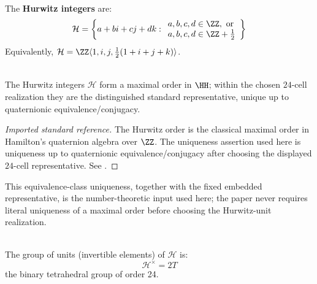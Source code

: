 \documentclass[11pt]{article}
\begin{document}
\begin{definition}
\label{p1:def:hurwitz-integers}
\mbox{}\\[6pt] 
The \textbf{Hurwitz integers} are:
\begin{equation}
    \mathcal{H} = \left\{a + bi + cj + dk : 
    \begin{array}{l}
    a,b,c,d \in \ZZ, \text{ or} \\
    a,b,c,d \in \ZZ + \tfrac{1}{2}
    \end{array}
    \right\}
\end{equation}
Equivalently, $\mathcal{H} = \ZZ\langle 1, i, j, \frac{1}{2}(1+i+j+k)\rangle$.
\end{definition}

\begin{theorem}[Hurwitz, 1896]
\label{p1:thm:hurwitz-maximal-order}
\mbox{}\\[6pt] 
The Hurwitz integers $\mathcal{H}$ form a maximal order in $\HH$; within the chosen \(24\)-cell realization they are the distinguished standard representative, unique up to quaternionic equivalence/conjugacy.
\cite{voight2021quaternion,conwaysmith2003quaternions}
\end{theorem}

\begin{proof}[Imported standard reference]
\leavevmode\par\noindent
The Hurwitz order is the classical maximal order in Hamilton's quaternion
algebra over \(\ZZ\).  The uniqueness assertion used here is uniqueness up to
quaternionic equivalence/\allowbreak conjugacy after choosing the displayed
\(24\)-cell representative.  See
\cite{voight2021quaternion,conwaysmith2003quaternions}.
\end{proof}


This equivalence-class uniqueness, together with the fixed embedded representative, is the number-theoretic input used here; the paper never requires literal uniqueness of a maximal order before choosing the Hurwitz-unit realization.

\begin{theorem}
\label{p1:thm:hurwitz-units-maximal-order}
\mbox{}\\[6pt] 
The group of units (invertible elements) of $\mathcal{H}$ is:
\begin{equation}
    \mathcal{H}^\times = 2T
\end{equation}
the binary tetrahedral group of order 24.
\cite{voight2021quaternion,conwaysmith2003quaternions}
\end{theorem}
\end{document}
